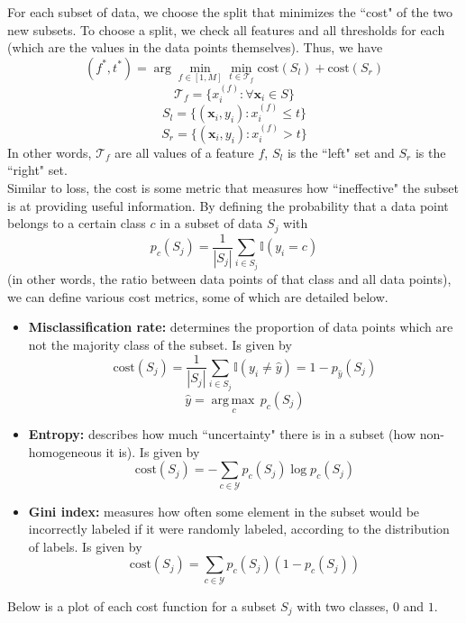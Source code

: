 \documentclass[12pt]{article}
\newcommand{\argmax}[1]{\underset{#1}{\operatorname{arg\,max\,}}}
\begin{document}
For each subset of data, we choose the split that minimizes the ``cost" of the two new subsets. To choose a split, we check all features and all thresholds for each (which are the values in the data points themselves). Thus, we have
\[ (f^*, t^*) = \arg\min\limits_{f\in[1,M]}\min\limits_{t\in\mathcal{T}_f}\text{cost}(S_l) + \text{cost}(S_r) \]
\vspace*{-1em}
\[ \mathcal{T}_f = \{x^{(f)}_i : \forall\mathbf{x}_i \in S \} \]
\[ S_l = \{(\mathbf{x}_i, y_i) : x^{(f)}_i \leq t \} \]
\[ S_r = \{(\mathbf{x}_i, y_i) : x^{(f)}_i > t \} \]
In other words, $\mathcal{T}_f$ are all values of a feature $f$, $S_l$ is the ``left" set and $S_r$ is the ``right" set.
\\\newline
Similar to loss, the cost is some metric that measures how ``ineffective" the subset is at providing useful information. By defining the probability that a data point belongs to a certain class $c$ in a subset of data $S_j$ with
\[ p_c(S_j) = \frac{1}{|S_j|}\sum_{i \in S_j}\mathbb{I}(y_i = c) \]
(in other words, the ratio between data points of that class and all data points), we can define various cost metrics, some of which are detailed below.
\begin{itemize}
	\item \textbf{Misclassification rate:} determines the proportion of data points which are not the majority class of the subset. Is given by
	\[ \text{cost}(S_j) = \frac{1}{|S_j|}\sum_{i \in S_j}\mathbb{I}(y_i \neq \hat{y}) = 1 - p_{\hat{y}}(S_j) \]
	\[ \hat{y} = \argmax{c}p_c(S_j) \]
	\item \textbf{Entropy:} describes how much ``uncertainty" there is in a subset (how non-homogeneous it is). Is given by
	\[ \text{cost}(S_j) = -\sum_{c \in \mathcal{Y}}p_c(S_j)\log p_c(S_j) \]
	\item \textbf{Gini index:} measures how often some element in the subset would be incorrectly labeled if it were randomly labeled, according to the distribution of labels. Is given by
	\[ \text{cost}(S_j) = \sum_{c \in \mathcal{Y}}p_c(S_j)(1 - p_c(S_j)) \]
\end{itemize}
Below is a plot of each cost function for a subset $S_j$ with two classes, $0$ and $1$.
\begin{center}
\end{center}
\end{document}
